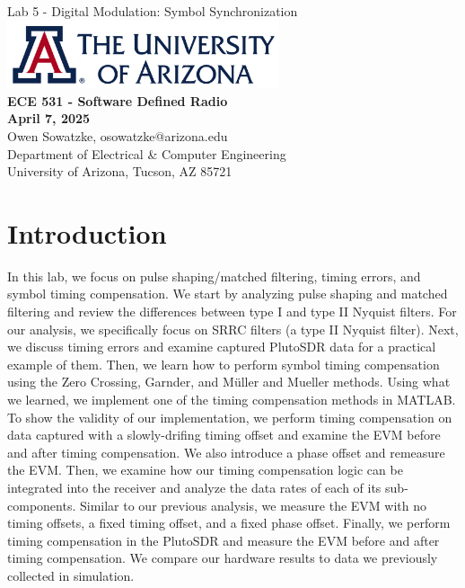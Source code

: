 \documentclass{article}
\begin{document}
\begin{titlepage}
	\centering
	{\huge Lab 5 - Digital Modulation: Symbol Synchronization}\\[0.25 in]
	\includegraphics[width=0.6\textwidth]{ua_logo.png}\\[0.25 in]
	{\large \textbf{ECE 531 - Software Defined Radio\\[0.25 in]
	April 7, 2025\\[0.25 in]}}
	{\large Owen Sowatzke, osowatzke@arizona.edu\\[0.05 in]
	Department of Electrical \& Computer Engineering\\[0.05 in]
	University of Arizona, Tucson, AZ 85721\\[0.5 in]}
	\hypersetup{linkcolor=navy-blue}
	\noindent\hrulefill
	\tableofcontents
	\noindent\hrulefill
\end{titlepage}


\section{Introduction}

In this lab, we focus on pulse shaping/matched filtering, timing errors, and symbol timing compensation. We start by analyzing pulse shaping and matched filtering and review the differences between type I and type II Nyquist filters. For our analysis, we specifically focus on SRRC filters (a type II Nyquist filter). Next, we discuss timing errors and examine captured PlutoSDR data for a practical example of them. Then, we learn how to perform symbol timing compensation using the Zero Crossing, Garnder, and M\"{u}ller and Mueller methods. Using what we learned, we implement one of the timing compensation methods in MATLAB. To show the validity of our implementation, we perform timing compensation on data captured with a slowly-drifing timing offset and examine the EVM before and after timing compensation. We also introduce a phase offset and remeasure the EVM. Then, we examine how our timing compensation logic can be integrated into the receiver and analyze the data rates of each of its sub-components. Similar to our previous analysis, we measure the EVM with no timing offsets, a fixed timing offset, and a fixed phase offset. Finally, we perform timing compensation in the PlutoSDR and measure the EVM before and after timing compensation. We compare our hardware results to data we previously collected in simulation.  
\end{document}
